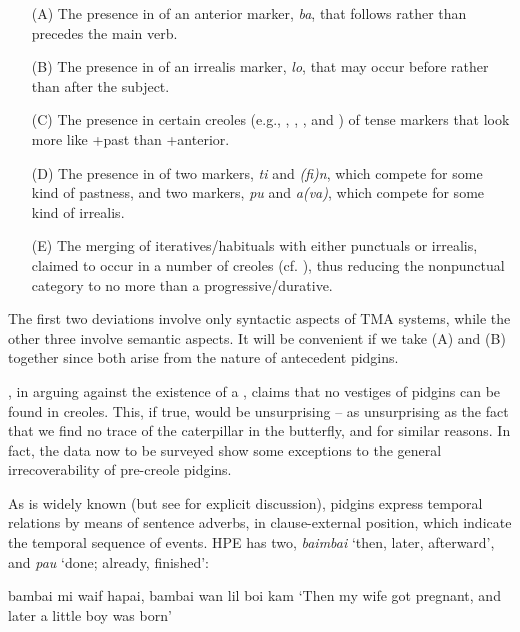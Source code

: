 \begin{itemize}\label{majordeviations}
\item[(A)] The presence in  of an anterior marker, \textit{ba}, that follows rather than precedes the main verb.
\item[(B)] The presence in  of an irrealis marker, \textit{lo}, that may occur before rather than after the subject.
\item[(C)] The presence in certain creoles (e.g., , , , and ) of tense markers that look more like +past than +anterior.
\item[(D)] The presence in  of two markers, \textit{ti} and \textit{(fi)n}, which compete for some kind of pastness, and two markers, \textit{pu} and \textit{a(va)}, which compete for some kind of irrealis.
\item[(E)] The merging of iteratives/habituals with either punctuals or irrealis, claimed to occur in a number of creoles (cf. \citealt{Taylor1971}), thus reducing the nonpunctual category to no more than a progressive/durative.
\end{itemize}

The first two deviations involve only syntactic aspects of TMA systems, while the other three involve semantic aspects. It will be convenient if we take (A) and (B) together since both arise from the nature of antecedent pidgins.

\citet{Alleyne1979}, in arguing against the existence of a , claims that no vestiges of pidgins can be found in creoles. This, if true, would be unsurprising -- as unsurprising as the fact that we find no trace of the caterpillar in the butterfly, and for similar reasons. In fact, the data now to be surveyed show some exceptions to the general irrecoverability of pre-creole pidgins.

As is widely known (but see \citet{Labov1971} for explicit discussion), pidgins express temporal relations by means of sentence adverbs, in clause-external position, which indicate the temporal sequence of events. HPE has two, \textit{baimbai} `then, later, afterward', and \textit{pau} `done; already, finished':

\ea\label{ex:2:92}
 {bambai} {mi} {waif} {hapai,} {bambai} {wan} {lil} {boi} {kam}
\glt `Then my wife got pregnant, and later a little boy was born'
\z

